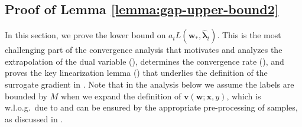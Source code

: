 \documentclass[11pt]{article}
\numberwithin{thm}{section}
\theoremstyle{plain}
\theoremstyle{definition}
\theoremstyle{remark} \newtheorem{remark}[thm]{Remark}
\def\vlambda{{\bm{\lambda}}}
\def\vv{{\bm{v}}}
\def\vw{{\bm{w}}}
\def\vx{{\bm{x}}}
\newcommand{\evlambda}{\widehat{\vlambda}}
\begin{document}
\subsection{Proof of Lemma \ref{lemma:gap-upper-bound2}}\label{sec:gap-upper-bound2}
In this section, we prove the lower bound on \(a_tL(\vw_*, \evlambda_{t})\). This is the most challenging part of the convergence analysis that motivates and analyzes the extrapolation of the dual variable (),  determines the convergence rate (), and proves the key linearization lemma () that underlies the definition of the surrogate gradient in . Note that in the analysis below we assume the labels are bounded by $M$ when we expand the definition of \(\vv(\vw;\vx,y)\), which is w.l.o.g.\ due to  and can be ensured by the appropriate pre-processing of samples, as discussed in .

\lemGapUpperTwo*
\end{document}
